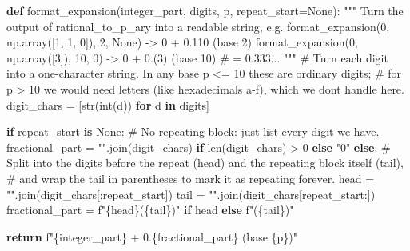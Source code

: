 \documentclass[
  letterpaper,
  DIV=11,
  numbers=noendperiod]{scrreprt}
\newenvironment{Shaded}{\begin{snugshade}}{\end{snugshade}}
\newcommand{\BuiltInTok}[1]{\textcolor[rgb]{0.00,0.23,0.31}{#1}}
\newcommand{\CommentTok}[1]{\textcolor[rgb]{0.37,0.37,0.37}{#1}}
\newcommand{\ControlFlowTok}[1]{\textcolor[rgb]{0.00,0.23,0.31}{\textbf{#1}}}
\newcommand{\DecValTok}[1]{\textcolor[rgb]{0.68,0.00,0.00}{#1}}
\newcommand{\KeywordTok}[1]{\textcolor[rgb]{0.00,0.23,0.31}{\textbf{#1}}}
\newcommand{\NormalTok}[1]{\textcolor[rgb]{0.00,0.23,0.31}{#1}}
\newcommand{\OperatorTok}[1]{\textcolor[rgb]{0.37,0.37,0.37}{#1}}
\newcommand{\SpecialCharTok}[1]{\textcolor[rgb]{0.37,0.37,0.37}{#1}}
\newcommand{\SpecialStringTok}[1]{\textcolor[rgb]{0.13,0.47,0.30}{#1}}
\newcommand{\StringTok}[1]{\textcolor[rgb]{0.13,0.47,0.30}{#1}}
\newcommand{\VariableTok}[1]{\textcolor[rgb]{0.07,0.07,0.07}{#1}}
\theoremstyle{plain}
\theoremstyle{plain}
\theoremstyle{definition}
\theoremstyle{definition}
\theoremstyle{definition}
\theoremstyle{plain}
\theoremstyle{plain}
\theoremstyle{remark}
\begin{document}
\begin{Shaded}
\begin{Highlighting}[]
\KeywordTok{def}\NormalTok{ format\_expansion(integer\_part, digits, p, repeat\_start}\OperatorTok{=}\VariableTok{None}\NormalTok{):}
    \CommentTok{"""}
\CommentTok{    Turn the output of rational\_to\_p\_ary into a readable string, e.g.}
\CommentTok{        format\_expansion(0, np.array([1, 1, 0]), 2, None) {-}\textgreater{} \textquotesingle{}0 + 0.110  (base 2)\textquotesingle{}}
\CommentTok{        format\_expansion(0, np.array([3]), 10, 0)          {-}\textgreater{} \textquotesingle{}0 + 0.(3)  (base 10)\textquotesingle{}   \# = 0.333...}
\CommentTok{    """}
    \CommentTok{\# Turn each digit into a one{-}character string. In any base p \textless{}= 10 these are ordinary digits;}
    \CommentTok{\# for p \textgreater{} 10 we would need letters (like hexadecimal\textquotesingle{}s a{-}f), which we don\textquotesingle{}t handle here.}
\NormalTok{    digit\_chars }\OperatorTok{=}\NormalTok{ [}\BuiltInTok{str}\NormalTok{(}\BuiltInTok{int}\NormalTok{(d)) }\ControlFlowTok{for}\NormalTok{ d }\KeywordTok{in}\NormalTok{ digits]}

    \ControlFlowTok{if}\NormalTok{ repeat\_start }\KeywordTok{is} \VariableTok{None}\NormalTok{:}
        \CommentTok{\# No repeating block: just list every digit we have.}
\NormalTok{        fractional\_part }\OperatorTok{=} \StringTok{""}\NormalTok{.join(digit\_chars) }\ControlFlowTok{if} \BuiltInTok{len}\NormalTok{(digit\_chars) }\OperatorTok{\textgreater{}} \DecValTok{0} \ControlFlowTok{else} \StringTok{"0"}
    \ControlFlowTok{else}\NormalTok{:}
        \CommentTok{\# Split into the digits before the repeat (head) and the repeating block itself (tail),}
        \CommentTok{\# and wrap the tail in parentheses to mark it as repeating forever.}
\NormalTok{        head }\OperatorTok{=} \StringTok{""}\NormalTok{.join(digit\_chars[:repeat\_start])}
\NormalTok{        tail }\OperatorTok{=} \StringTok{""}\NormalTok{.join(digit\_chars[repeat\_start:])}
\NormalTok{        fractional\_part }\OperatorTok{=} \SpecialStringTok{f"}\SpecialCharTok{\{}\NormalTok{head}\SpecialCharTok{\}}\SpecialStringTok{(}\SpecialCharTok{\{}\NormalTok{tail}\SpecialCharTok{\}}\SpecialStringTok{)"} \ControlFlowTok{if}\NormalTok{ head }\ControlFlowTok{else} \SpecialStringTok{f"(}\SpecialCharTok{\{}\NormalTok{tail}\SpecialCharTok{\}}\SpecialStringTok{)"}

    \ControlFlowTok{return} \SpecialStringTok{f"}\SpecialCharTok{\{}\NormalTok{integer\_part}\SpecialCharTok{\}}\SpecialStringTok{ + 0.}\SpecialCharTok{\{}\NormalTok{fractional\_part}\SpecialCharTok{\}}\SpecialStringTok{  (base }\SpecialCharTok{\{}\NormalTok{p}\SpecialCharTok{\}}\SpecialStringTok{)"}
\end{Highlighting}
\end{Shaded}
\end{document}
